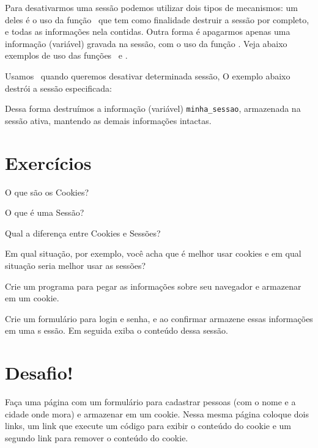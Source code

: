 Para desativarmos uma sessão podemos utilizar dois tipos de mecanismos: um deles é o uso da função 
\funcaosessiondestroy~que tem como finalidade destruir a sessão por completo, e todas as informações 
nela contidas. Outra forma é apagarmos apenas uma informação (variável) gravada na sessão, 
com o uso da função \funcaounset. Veja abaixo exemplos de uso das funções \funcaosessiondestroy~e
\funcaounset.



Usamos \funcaounset~quando queremos desativar determinada sessão, O exemplo abaixo destrói a 
sessão especificada:



Dessa forma destruímos a informação (variável) \texttt{minha\_sessao}, armazenada na sessão 
ativa, mantendo as demais informações intactas.


\section{Exercícios}
\label{cap10-exercicios}

\begin{description}[labelindent=30pt]
  \item [Q. 01] O que são os Cookies?
  \item [Q. 02] O que é uma Sessão? 
  \item [Q. 03] Qual a diferença entre Cookies e Sessões?
  \item [Q. 04] Em qual situação, por exemplo, você acha que é melhor usar cookies e em qual situação 
  seria melhor usar as sessões?
  \item [Q. 05] Crie um programa para pegar as informações sobre seu navegador e armazenar em um cookie.
  \item [Q. 06] Crie um formulário para login e senha, e ao confirmar armazene essas informações em uma s
  essão. Em seguida exiba o conteúdo dessa sessão. 

\end{description}

\section{Desafio!}
\label{cap10-desafio}

Faça uma página com um formulário para cadastrar pessoas (com o nome e a cidade onde mora) e armazenar 
em um cookie. Nessa mesma página coloque dois links, um link que execute um código \php para exibir o 
conteúdo do cookie e um segundo link para remover o conteúdo do cookie.


